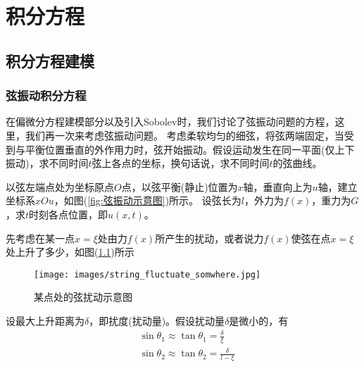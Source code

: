
\chapter{积分方程}
\section{积分方程建模}
	\label{sec:积分方程建模}
	\subsection{弦振动积分方程}
		\label{subsec:弦振动积分方程}
		\par
		在偏微分方程建模部分以及引入Sobolev时，我们讨论了弦振动问题的方程，这里，我们再一次来考虑弦振动问题。
		考虑柔软均匀的细弦，将弦两端固定，当受到与平衡位置垂直的外作用力时，弦开始振动。假设运动发生在同一平面(仅上下振动)，求不同时间$t$弦上各点的坐标，换句话说，求不同时间$t$的弦曲线。
        \par
        以弦左端点处为坐标原点$O$点，以弦平衡(静止)位置为$x$轴，垂直向上为$u$轴，建立坐标系$xOu$，如图(\ref{fig:弦振动示意图})所示。
        设弦长为$l$，外力为$f(x)$，重力为$G$，求$t$时刻各点位置，即$u(x,t)$。
        \par
        先考虑在某一点$x = \xi$处由力$f(x)$所产生的扰动，或者说力$f(x)$使弦在点$x = \xi$处上升了多少，如图(\ref{fig:某点处的弦扰动示意图})所示
        \begin{figure}[H]
		\centering
		\texttt{[image: images/string\_fluctuate\_somwhere.jpg]}
		\caption{某点处的弦扰动示意图}
		\label{fig:某点处的弦扰动示意图}
		\end{figure}
        设最大上升距离为$\delta$，即扰度(扰动量)。假设扰动量$\delta$是微小的，有
        \begin{align*}
        &\sin \theta_1 \approx \tan \theta _1 = \frac{\delta }{\xi} \\
        &\sin \theta_2 \approx \tan \theta _2 = \frac{\delta }{l - \xi}
        \end{align*}
